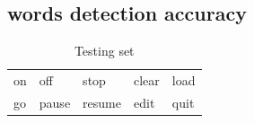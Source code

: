 \begin{figure}[t]
		\centering
		\caption{}
		\label{fig:solarPwrCoIS}
\end{figure} 

\subsection{\fullcim words detection accuracy}
\begin{table}[H]
\centering
\caption{Testing set}
\label{tab:words}
\begin{tabular}{lllll}
\hline
on    & off  & stop & clear & load   \\
go & pause & resume & edit  & quit  \\  
\hline  
\end{tabular}
\end{table}


